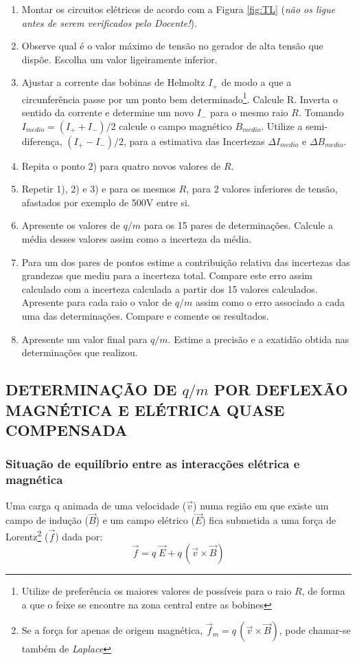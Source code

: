 \documentclass[a4paper,twoside,12pt]{article}      %
\begin{document}
\begin{enumerate}
	\item Montar os circuitos elétricos de acordo com a  Figura \ref{fig:TL} 
	(\emph{não os ligue antes de serem verificados pelo Docente!}).
	\item Observe qual é o valor máximo de tensão no gerador de  alta tensão que dispõe. Escolha um valor ligeiramente inferior.
	\item Ajustar a corrente das bobinas de Helmoltz $I_+$ de modo a que a circunferência passe por um ponto bem determinado\footnote{Utilize de preferência os maiores valores de possíveis para o raio $R$, de forma a que o feixe se encontre na zona central entre as bobines}.  Calcule R.
	Inverta o sentido da corrente e determine um novo $I_-$ para o mesmo raio $R$.
	Tomando $I_{medio} = (I_+ + I_-)/2 $ calcule o campo magnético $B_{medio}$. Utilize a semi-diferença, $(I_+ - I_-)/2$, para a estimativa das Incertezas $\Delta I_{medio}$ e $\Delta B_{medio}$.
	\item Repita o ponto 2) para quatro novos valores de $R$. 
	\item Repetir 1), 2) e 3)  e para os mesmos $R$, para 2 valores inferiores de tensão, afastados por exemplo de 500V entre si.
	\item Apresente os valores de $q/m$ para os 15 pares de determinações. Calcule a média desses valores assim como a incerteza da média.
	\item Para um dos pares de pontos estime a contribuição relativa das incertezas das grandezas que mediu para a incerteza total. Compare este erro assim calculado com a incerteza calculada a partir dos 15 valores calculados.
	Apresente para cada raio o valor de $q/m$ assim como o erro associado a cada uma das determinações. Compare e comente os resultados.
	\item Apresente um valor final para $q/m$. Estime a precisão e a exatidão obtida nas determinações que realizou.
\end{enumerate}
 
\subsection{\sf DETERMINAÇÃO DE $q/m$ POR DEFLEXÃO\\ MAGNÉTICA E ELÉTRICA QUASE COMPENSADA }

\subsubsection{\sf Situação de equilíbrio entre as interacções elétrica e magnética}
Uma carga q animada de uma velocidade ($\vec{v}$) numa região em que existe um campo de indução ($\vec{B}$) e um campo elétrico ($\vec{E}$) fica submetida a uma força de Lorentz\footnote{Se a força for apenas de origem magnética, $\vec{f}_m =  q\,(\vec{v} \times \vec{B})$, pode chamar-se também de \emph{Laplace}} ($\vec{f}$) dada por:
\begin{equation}
	\label{eq:Lorentz}
 \vec{f} = q\; \vec{E} + q\,(\vec{v} \times \vec{B})
\end{equation}
\end{document}
